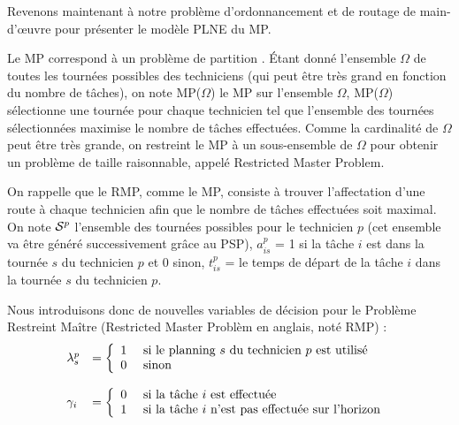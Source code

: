 Revenons maintenant à notre problème d'ordonnancement et de routage de main-d'\oe uvre pour présenter le modèle PLNE du MP.


Le MP correspond à un problème de partition \cite{balas1976set}. Étant donné l'ensemble $\Omega$ de toutes les tournées possibles des techniciens (qui peut être très grand en fonction du nombre de tâches), on note MP($\Omega$) le MP sur l'ensemble $\Omega$, MP($\Omega$) sélectionne une tournée pour chaque technicien tel que l'ensemble des tournées sélectionnées maximise le nombre de tâches effectuées.
Comme la cardinalité de $\Omega$ peut être très grande, on restreint le MP à un sous-ensemble de $\Omega$ pour obtenir un problème de taille raisonnable, appelé Restricted Master Problem.

On rappelle que le RMP, comme le MP, consiste à trouver l'affectation d'une route à chaque technicien afin que le nombre de tâches effectuées soit maximal.
On note $\mathcal{S}^{p}$ l'ensemble des tournées possibles pour le technicien $p$ (cet ensemble va être généré successivement grâce au PSP), $a_{is}^p$ = 1 si la tâche $i$ est dans la tournée $s$ du technicien $p$ et 0 sinon, $t_{is}^p$ = le temps de départ de la tâche $i$ dans la tournée $s$ du technicien $p$.

Nous introduisons donc de nouvelles variables de décision pour le Problème Restreint Maître (Restricted Master Problèm en anglais, noté RMP) :
$$
\begin{array}{ll}
\lambda_{s}^{p} & = 
	\left\{ 
		\begin{array}{ll}
			1 & \text{ si le planning $s$ du technicien $p$ est utilisé  } \\
            0 & \text{ sinon}
		\end{array}
    \right.\\
    & \\
\gamma_i & = 
	\left\{ 
		\begin{array}{ll}
			0 & \text{ si la tâche $i$ est effectuée  }\\
            1 & \text{ si la tâche $i$ n'est pas effectuée sur l'horizon   } 
		\end{array}
    \right.\\
    & \\
\end{array}
$$

